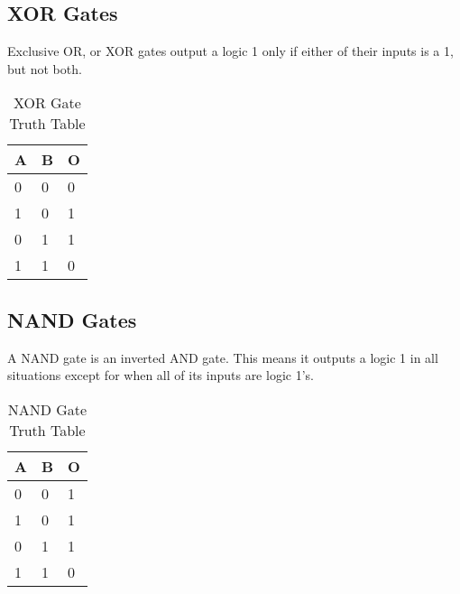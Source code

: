 \documentclass[11pt]{informatics-report}
\begin{document}
\subsection{XOR Gates}
Exclusive OR, or XOR gates output a logic 1 only if either of their inputs is a 1, but not both.
\begin{table}[h]
\centering
\begin{tabular}{l|l|l}
\hline
\multicolumn{1}{|l|}{\textbf{A}} & \textbf{B} & \multicolumn{1}{l|}{\textbf{O}} \\ \hline
0                                & 0          & 0                               \\
1                                & 0          & 1                               \\
0                                & 1          & 1                               \\
1                                & 1          & 0
\end{tabular}
\caption{XOR Gate Truth Table}
\label{tab:xor-table}
\end{table}

\subsection{NAND Gates}
A NAND gate is an inverted AND gate. This means it outputs a logic 1 in all situations except for when all of its inputs are logic 1's.
\begin{table}[h]
\centering
\begin{tabular}{l|l|l}
\hline
\multicolumn{1}{|l|}{\textbf{A}} & \textbf{B} & \multicolumn{1}{l|}{\textbf{O}} \\ \hline
0                                & 0          & 1                               \\
1                                & 0          & 1                               \\
0                                & 1          & 1                               \\
1                                & 1          & 0
\end{tabular}
\caption{NAND Gate Truth Table}
\label{tab:nand-table}
\end{table}
\end{document}
